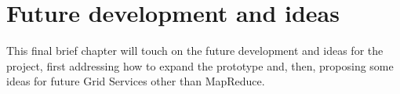 \chapter{Future development and ideas}
This final brief chapter will touch on the future development and ideas for the project, first addressing how to expand the prototype and, then, proposing some ideas for future Grid Services other than MapReduce.



